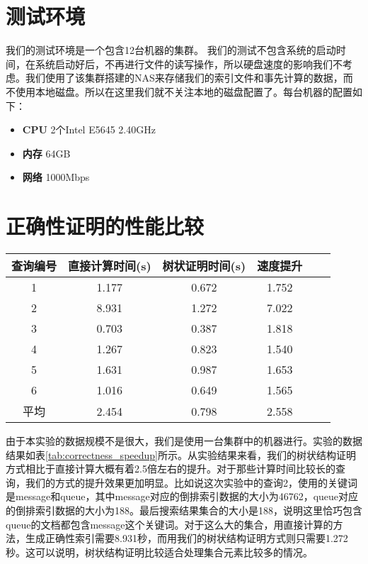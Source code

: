 \section {测试环境}

我们的测试环境是一个包含12台机器的集群。
我们的测试不包含系统的启动时间，在系统启动好后，不再进行文件的读写操作，所以硬盘速度的影响我们不考虑。我们使用了该集群搭建的NAS来存储我们的索引文件和事先计算的数据，而不使用本地磁盘。所以在这里我们就不关注本地的磁盘配置了。每台机器的配置如下：

\begin{itemize}
    \item \textbf{CPU} 2个Intel E5645 2.40GHz
    \item \textbf{内存} 64GB
    \item \textbf{网络} 1000Mbps
\end{itemize}

\section {正确性证明的性能比较}
\begin{table}[htb]
    \centering
    \begin{tabular}{cccccc}
        \toprule
        查询编号 & 直接计算时间(s) & 树状证明时间(s) & 速度提升 \\
        \midrule
        1 & 1.177 & 0.672 & 1.752  \\
        2 & 8.931 & 1.272 & 7.022  \\
        3 & 0.703 & 0.387 & 1.818  \\
        4 & 1.267 & 0.823 & 1.540  \\
        5 & 1.631 & 0.987 & 1.653  \\
        6 & 1.016 & 0.649 & 1.565  \\
        \midrule
        平均 & 2.454 & 0.798 & 2.558  \\
        \bottomrule
    \end{tabular}
\end{table}

由于本实验的数据规模不是很大，我们是使用一台集群中的机器进行。实验的数据结果如表\ref{tab:correctness_speedup}所示。从实验结果来看，我们的树状结构证明方式相比于直接计算大概有着2.5倍左右的提升。对于那些计算时间比较长的查询，我们的方式的提升效果更加明显。比如说这次实验中的查询2，使用的关键词是message和queue，其中message对应的倒排索引数据的大小为46762，queue对应的倒排索引数据的大小为188。最后搜索结果集合的大小是188，说明这里恰巧包含queue的文档都包含message这个关键词。对于这么大的集合，用直接计算的方法，生成正确性索引需要8.931秒，而用我们的树状结构证明方式则只需要1.272秒。这可以说明，树状结构证明比较适合处理集合元素比较多的情况。

